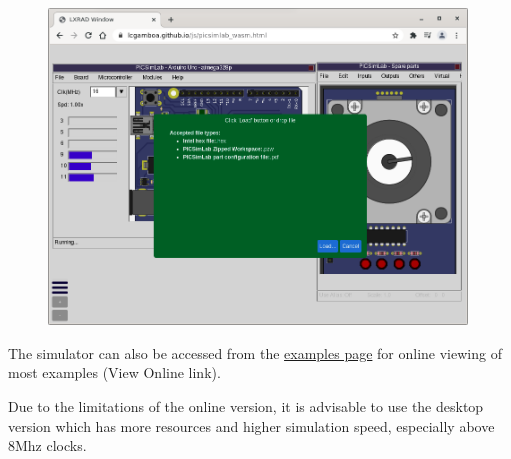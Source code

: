 \begin{figure}[H]
\center
\includegraphics[width=0.99\textwidth]{img/online2.png} 
\end{figure} 

The simulator can also be accessed from the \href{https://lcgamboa.github.io/picsimlab_examples/examples_index.html}{examples page} for online viewing of most examples (View Online link). 

Due to the limitations of the online version, it is advisable to use the desktop version which has more resources and higher simulation speed, especially above 8Mhz clocks. 
